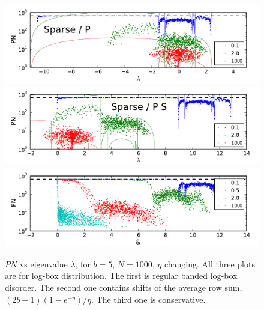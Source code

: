 \documentclass[onecolumn,fleqn,longbibliography]{revtex4}
\begin{document}
\begin{figure}[H]
    \includegraphics{pta_exp_regular}\\
    \includegraphics{pta_exp_shift}\\
    \includegraphics{pta_exp_cons}
    \caption{$PN$ vs eigenvalue $\lambda$, for $b=5$, $N=1000$, $\eta$ changing. 
    All three plots are for log-box distribution. The first is regular banded 
    log-box disorder. The second one contains shifts of the average row sum,
    $(2b+1)(1-e^{-\eta})/\eta$. The third one is conservative. }
    \label{fig:exp}
\end{figure}



\end{document}
